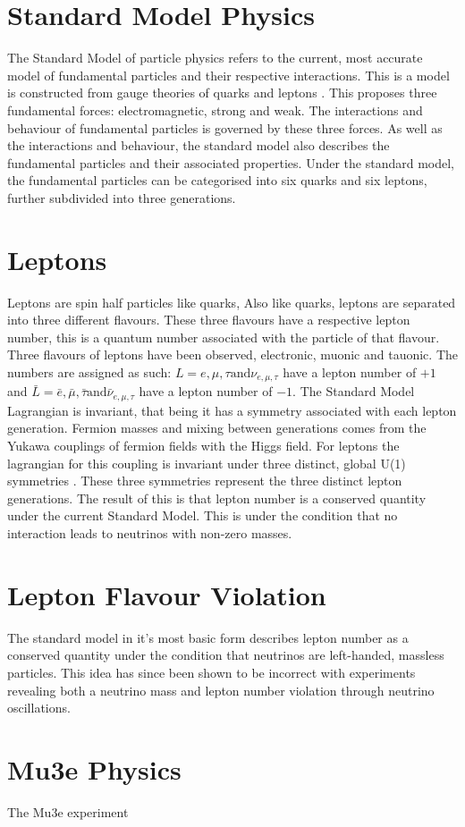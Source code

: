 \section*{Standard Model Physics}
The Standard Model of particle physics refers to the current, most accurate model of fundamental particles and their respective interactions. 
This is a model is constructed from gauge theories of quarks and leptons \cite{Kuno:1999jp}. 
This proposes three fundamental forces: electromagnetic, strong and weak. 
The interactions and behaviour of fundamental particles is governed by these three forces. 
As well as the interactions and behaviour, the standard model also describes the fundamental particles and their associated properties. 
Under the standard model, the fundamental particles can be categorised into six quarks and six leptons, further subdivided into three generations.
\section*{Leptons}
Leptons are spin half particles like quarks, Also like quarks, leptons are separated into three different flavours. 
These three flavours have a respective lepton number, this is a quantum number associated with the particle of that flavour. 
Three flavours of leptons have been observed, electronic, muonic and tauonic. 
The numbers are assigned as such: $L = e, \mu, \tau \text{and} \nu_{e, \mu, \tau}$ have a lepton number of $+1$ and $\bar{L} = \bar{e}, \bar{\mu}, \bar{\tau} \text{and} \bar{\nu}_{e, \mu, \tau}$ have a lepton number of $-1$. 
The Standard Model Lagrangian is invariant, that being it has a symmetry associated with each lepton generation. 
Fermion masses and mixing between generations comes from the Yukawa couplings of fermion fields with the Higgs field. 
For leptons the lagrangian for this coupling is invariant under three distinct, global U(1) symmetries \cite{Calibbi}. 
These three symmetries represent the three distinct lepton generations. 
The result of this is that lepton number is a conserved quantity under the current Standard Model. 
This is under the condition that no interaction leads to neutrinos with non-zero masses.
\section*{Lepton Flavour Violation}
The standard model in it's most basic form describes lepton number as a conserved quantity under the condition that neutrinos are left-handed, massless particles. 
This idea has since been shown to be incorrect with experiments revealing both a neutrino mass and lepton number violation through neutrino oscillations.
\section*{Mu3e Physics}
The Mu3e experiment 
